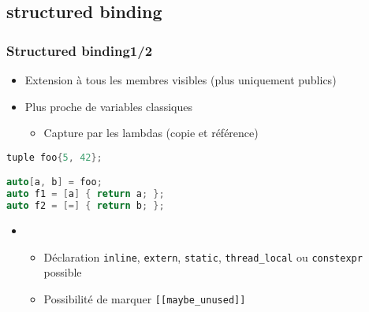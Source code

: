\documentclass[C++.tex]{subfiles}
\begin{document}
\subsection*{structured binding}
\begin{frame}[fragile]
	\frametitle{Structured binding\titlehfill{}1/2}
	\begin{itemize}
		\item Extension à tous les membres visibles (plus uniquement publics)

	
		\item Plus proche de variables classiques
		\begin{itemize}
			\item Capture par les lambdas (copie et référence)
		\end{itemize}
	\end{itemize}


	\begin{lstlisting}[language=C++]
tuple foo{5, 42};

auto[a, b] = foo;
auto f1 = [a] { return a; };
auto f2 = [=] { return b; };\end{lstlisting}

	\begin{itemize}
		\item [] \begin{itemize}
			\item Déclaration \lstinline|inline|, \lstinline|extern|, \lstinline|static|, \lstinline|thread_local| ou \lstinline|constexpr| possible
			\item Possibilité de marquer \lstinline|[[maybe_unused]]|
		\end{itemize}
	\end{itemize}
\end{frame}
\end{document}
